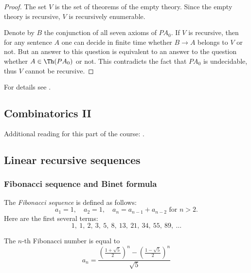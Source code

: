 \begin{page}

\begin{proof}
The set $V$ is the set of theorems of the empty theory. Since the empty theory is recursive, $V$ is recursively enumerable.

Denote by $B$ the conjunction of all seven axioms of $PA_0$.
If $V$ is recursive, then for any sentence $A$ one can decide in finite time whether $B \to A$ belongs to $V$ or not.
But an answer to this question is equivalent to an answer to the question whether $A \in \Th(PA_0)$ or not.
This contradicts the fact that $PA_0$ is undecidable, thus $V$ cannot be recursive.
\end{proof}




For details see \cite{CL1,CL2}.





\end{page}

\begin{page}

\chapter{Combinatorics II}
Additional reading for this part of the course: \cite{Aig07}.

\section{Linear recursive sequences}
\subsection{Fibonacci sequence and Binet formula}
The \emph{Fibonacci sequence} is defined as follows:
\[
a_1 = 1, \quad a_2 = 1, \quad a_n = a_{n-1} + a_{n-2} \text{ for }n > 2.
\]
Here are the first several terms:
\[
1,\ 1,\ 2,\ 3,\ 5,\ 8,\ 13,\ 21,\ 34,\ 55,\ 89,\ \ldots
\]


\end{page}

\begin{page}

\begin{thm}[Binet]
\label{thm:Binet}
The $n$-th Fibonacci number is equal to
\[
a_n = \frac{\left(\frac{1+\sqrt{5}}2\right)^n - \left(\frac{1-\sqrt{5}}2\right)^n}{\sqrt{5}}
\]
\end{thm}

\end{page}

